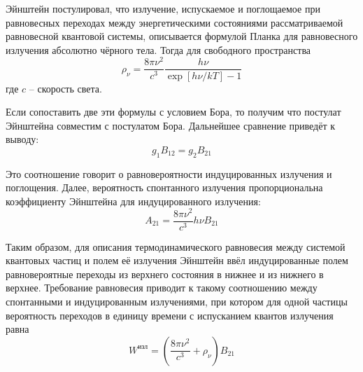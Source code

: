Эйнштейн постулировал, что излучение, испускаемое и поглощаемое при 
равновесных переходах между энергетическими состояниями рассматриваемой 
равновесной квантовой системы, описывается формулой Планка для 
равновесного излучения абсолютно чёрного тела. Тогда для свободного 
пространства
\[
	\rho_\nu = \frac{8\pi\nu^2}{c^3}\frac{h\nu}{\exp[h\nu/kT] - 1}
\]
где \( c \) -- скорость света.

Если сопоставить две эти формулы с условием Бора, то получим что 
постулат Эйнштейна совместим с постулатом Бора. Дальнейшее сравнение приведёт 
к выводу:
\[
	g_1 B_{12} = g_2 B_{21}
\]

Это соотношение говорит о равновероятности индуцированных излучения и 
поглощения. Далее, вероятность спонтанного излучения пропорциональна 
коэффициенту Эйнштейна для индуцированного излучения:
\[
	A_{21} = \frac{8\pi\nu^2}{c^3}h\nu B_{21}
\]

Таким образом, для описания термодинамического равновесия между системой 
квантовых частиц и полем её излучения Эйнштейн ввёл индуцированные полем 
равновероятные переходы из верхнего состояния в нижнее и из нижнего в верхнее. 
Требование равновесия приводит к такому соотношению между спонтанными и 
индуцированным излучениями, при котором для одной частицы вероятность 
переходов в единицу времени с испусканием квантов излучения равна
\[
	W^\text{изл} = \left( \frac{8\pi\nu^2}{c^3} + \rho_\nu \right)B_{21}
\]

